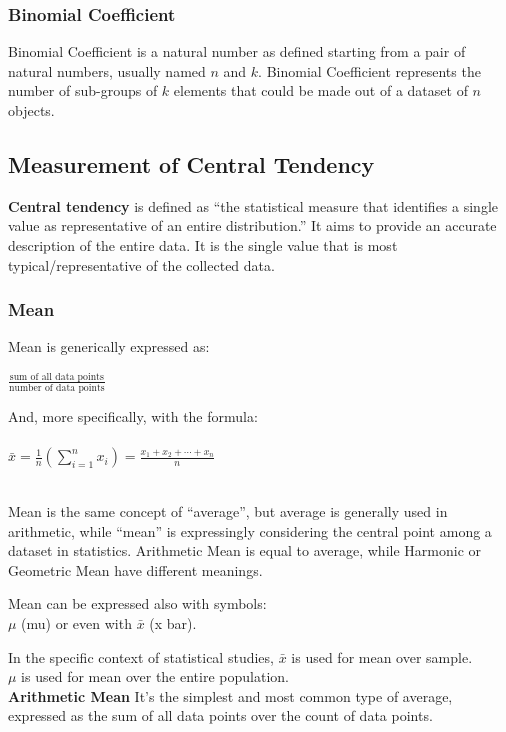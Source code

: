 \documentclass{article}
\begin{document}
\subsubsection{Binomial Coefficient}
Binomial Coefficient is a natural number as defined starting from a pair of natural numbers, usually named $n$ and $k$. 
Binomial Coefficient represents the number of sub-groups of $k$ elements that could be made out of a dataset of $n$ objects.

\subsection{Measurement of Central Tendency}
\textbf{Central tendency} is defined as “the statistical measure that identifies a single value as representative of an entire distribution.” It aims to provide an accurate description of the entire data. It is the single value that is most typical/representative of the collected data.

\subsubsection{Mean}
Mean is generically expressed as:

$\frac{\text{sum of all data points}}{\text{number of data points}}$

And, more specifically, with the formula:\\
\mbox{} \\

${\displaystyle {\bar{x}}={\frac{1}{n}}\left(\sum _{i=1}^{n}{x_{i}}\right)={\frac{x_{1}+x_{2}+\cdots +x_{n}}{n}}}$

\mbox{} \\

Mean is the same concept of “average”, but average is generally used in arithmetic, while “mean” is expressingly considering the central point among a dataset in statistics. Arithmetic Mean is equal to average, while Harmonic or Geometric Mean have different meanings. 

Mean can be expressed also with symbols:\\
$\mu$ (mu) or even with $\bar{x}$ (x bar).

In the specific context of statistical studies, 
$\bar{x}$ is used for mean over sample.\\
$\mu$ is used for mean over the entire population.\\

\textbf{Arithmetic Mean}
It's the simplest and most common type of  average, expressed as the sum of all data points over the count of data points.
\end{document}
